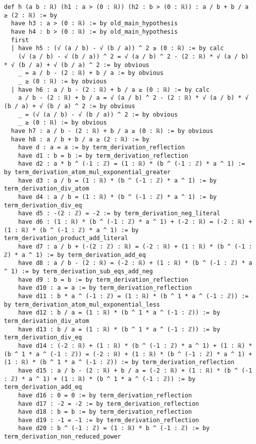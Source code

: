 \documentclass{article}
\begin{document}
\begin{tcolorbox}[colback=white!10, width=\linewidth]
\begin{lstlisting}[language=Lean4]
def h (a b : ℝ) (h1 : a > (0 : ℝ)) (h2 : b > (0 : ℝ)) : a / b + b / a ≥ (2 : ℝ) := by
  have h3 : a > (0 : ℝ) := by old_main_hypothesis
  have h4 : b > (0 : ℝ) := by old_main_hypothesis
  first
  | have h5 : (√ (a / b) - √ (b / a)) ^ 2 ≥ (0 : ℝ) := by calc
    (√ (a / b) - √ (b / a)) ^ 2 = √ (a / b) ^ 2 - (2 : ℝ) * √ (a / b) * √ (b / a) + √ (b / a) ^ 2 := by obvious
    _ = a / b - (2 : ℝ) + b / a := by obvious
    _ ≥ (0 : ℝ) := by obvious
  | have h6 : a / b - (2 : ℝ) + b / a ≥ (0 : ℝ) := by calc
    a / b - (2 : ℝ) + b / a = √ (a / b) ^ 2 - (2 : ℝ) * √ (a / b) * √ (b / a) + √ (b / a) ^ 2 := by obvious
    _ = (√ (a / b) - √ (b / a)) ^ 2 := by obvious
    _ ≥ (0 : ℝ) := by obvious
  have h7 : a / b - (2 : ℝ) + b / a ≥ (0 : ℝ) := by obvious
  have h8 : a / b + b / a ≥ (2 : ℝ) := by
    have d : a = a := by term_derivation_reflection
    have d1 : b = b := by term_derivation_reflection
    have d2 : a * b ^ (-1 : ℤ) = (1 : ℝ) * (b ^ (-1 : ℤ) * a ^ 1) := by term_derivation_atom_mul_exponential_greater
    have d3 : a / b = (1 : ℝ) * (b ^ (-1 : ℤ) * a ^ 1) := by term_derivation_div_atom
    have d4 : a / b = (1 : ℝ) * (b ^ (-1 : ℤ) * a ^ 1) := by term_derivation_div_eq
    have d5 : -(2 : ℤ) = -2 := by term_derivation_neg_literal
    have d6 : (1 : ℝ) * (b ^ (-1 : ℤ) * a ^ 1) + (-2 : ℝ) = (-2 : ℝ) + (1 : ℝ) * (b ^ (-1 : ℤ) * a ^ 1) := by term_derivation_product_add_literal
    have d7 : a / b + (-(2 : ℤ) : ℝ) = (-2 : ℝ) + (1 : ℝ) * (b ^ (-1 : ℤ) * a ^ 1) := by term_derivation_add_eq
    have d8 : a / b - (2 : ℝ) = (-2 : ℝ) + (1 : ℝ) * (b ^ (-1 : ℤ) * a ^ 1) := by term_derivation_sub_eqs_add_neg
    have d9 : b = b := by term_derivation_reflection
    have d10 : a = a := by term_derivation_reflection
    have d11 : b * a ^ (-1 : ℤ) = (1 : ℝ) * (b ^ 1 * a ^ (-1 : ℤ)) := by term_derivation_atom_mul_exponential_less
    have d12 : b / a = (1 : ℝ) * (b ^ 1 * a ^ (-1 : ℤ)) := by term_derivation_div_atom
    have d13 : b / a = (1 : ℝ) * (b ^ 1 * a ^ (-1 : ℤ)) := by term_derivation_div_eq
    have d14 : (-2 : ℝ) + (1 : ℝ) * (b ^ (-1 : ℤ) * a ^ 1) + (1 : ℝ) * (b ^ 1 * a ^ (-1 : ℤ)) = (-2 : ℝ) + (1 : ℝ) * (b ^ (-1 : ℤ) * a ^ 1) + (1 : ℝ) * (b ^ 1 * a ^ (-1 : ℤ)) := by term_derivation_reflection
    have d15 : a / b - (2 : ℝ) + b / a = (-2 : ℝ) + (1 : ℝ) * (b ^ (-1 : ℤ) * a ^ 1) + (1 : ℝ) * (b ^ 1 * a ^ (-1 : ℤ)) := by term_derivation_add_eq
    have d16 : 0 = 0 := by term_derivation_reflection
    have d17 : -2 = -2 := by term_derivation_reflection
    have d18 : b = b := by term_derivation_reflection
    have d19 : -1 = -1 := by term_derivation_reflection
    have d20 : b ^ (-1 : ℤ) = (1 : ℝ) * b ^ (-1 : ℤ) := by term_derivation_non_reduced_power

\end{lstlisting}
\end{tcolorbox}
\end{document}
